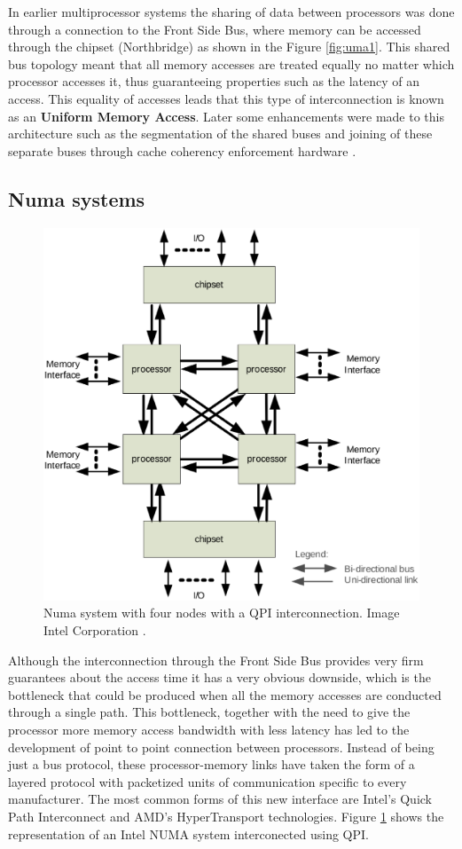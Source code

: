 In earlier multiprocessor systems the sharing of data between processors was done through a connection to the Front Side Bus, where memory can be accessed through the chipset (Northbridge) as shown in the Figure \ref{fig:uma1}. This shared bus topology meant that all memory accesses are treated equally no matter which processor accesses it, thus guaranteeing properties such as the latency of an access. This equality of accesses leads that this type of interconnection is known as an \textbf{Uniform Memory Access}. Later some enhancements were made to this architecture such as the segmentation of the shared buses and joining of these separate buses through cache coherency enforcement hardware \cite{qpi-intel}.

\subsection{Numa systems}\label{subsection:numa}

\begin{figure}
	\centering
		\includegraphics[width=.6\textwidth]{figures/numa-qpi.eps}
		\caption[basic-uma]{Numa system with four nodes with a QPI interconnection. Image Intel Corporation \cite{qpi-intel}. }
		\label{fig:numa1}
\end{figure}

Although the interconnection through the Front Side Bus provides very firm guarantees about the access time it has a very obvious downside, which is the bottleneck that could be produced when all the memory accesses are conducted through a single path. This bottleneck, together with the need to give the processor more memory access bandwidth with less latency has led to the development of point to point connection between processors. Instead of being just a bus protocol, these processor-memory links have taken the form of a layered protocol with packetized units of communication specific to every manufacturer. The most common forms of this new interface are Intel's Quick Path Interconnect and AMD's HyperTransport technologies. Figure \ref{fig:numa1} shows the representation of an Intel NUMA system interconected using QPI.


